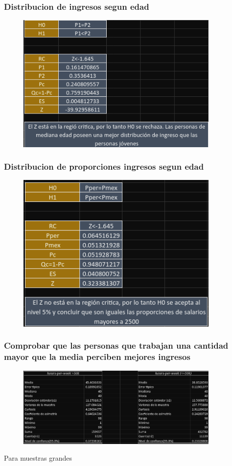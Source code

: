 \documentclass{beamer}
\begin{document}
\begin{frame}
  \frametitle{Distribucion de ingresos segun edad}
\begin{figure}[t]
    \includegraphics[width=10cm]{cuyate1.png}
\end{figure}
\end{frame}


\begin{frame}
  \frametitle{Distribucion de proporciones ingresos segun edad}
\begin{figure}[t]
    \includegraphics[width=10cm]{cuyate2.png}
\end{figure}
\end{frame}

\begin{frame}
  \frametitle{Comprobar que las personas que trabajan una cantidad
  mayor que la media perciben mejores ingresos
  }
  \begin{figure}[t]
      \includegraphics[width=10cm]{alvares1.png}
  \end{figure}
\end{frame}

\begin{frame}
  Para muestras grandes

\end{frame}
\end{document}
